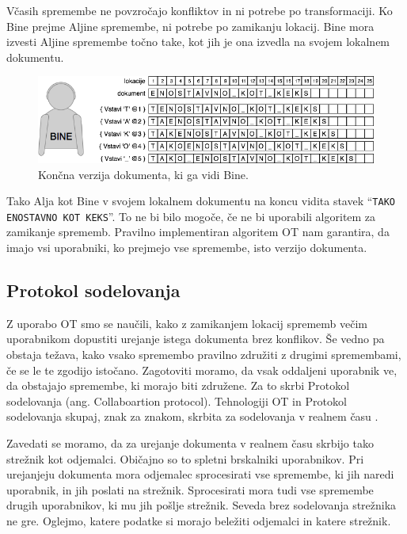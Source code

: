 \documentclass[a4paper, 12pt, twoside]{book}
\begin{document}
Včasih spremembe ne povzročajo konfliktov in ni potrebe po transformaciji. Ko Bine prejme Aljine spremembe, ni potrebe po zamikanju lokacij. Bine mora izvesti Aljine spremembe točno take, kot jih je ona izvedla na svojem lokalnem dokumentu.

\begin{figure}[placement h]
\begin{center}
\includegraphics[width=12cm]{ot6.png}
\end{center}
\caption{Končna verzija dokumenta, ki ga vidi Bine.}
\label{ot6}
\end{figure}

Tako Alja kot Bine v svojem lokalnem dokumentu na koncu vidita stavek “{\tt TAKO ENOSTAVNO KOT KEKS}”. To ne bi bilo mogoče, če ne bi uporabili algoritem za zamikanje sprememb. Pravilno implementiran algoritem OT nam garantira, da imajo vsi uporabniki, ko prejmejo vse spremembe, isto verzijo dokumenta.

\subsection{Protokol sodelovanja}
\label{subsec:ps}

Z uporabo OT smo se naučili, kako z zamikanjem lokacij sprememb večim uporabnikom dopustiti urejanje istega dokumenta brez konflikov. Še vedno pa obstaja težava, kako vsako spremembo pravilno združiti z drugimi spremembami, če se le te zgodijo istočano. Zagotoviti moramo, da vsak oddaljeni uporabnik ve, da obstajajo spremembe, ki morajo biti združene. Za to skrbi Protokol sodelovanja (ang. Collaboartion protocol). Tehnologiji OT in Protokol sodelovanja skupaj, znak za znakom, skrbita za sodelovanja v realnem času \cite{gdocs23}.

Zavedati se moramo, da za urejanje dokumenta v realnem času skrbijo tako strežnik kot odjemalci. Običajno so to spletni brskalniki uporabnikov. Pri urejanjeju dokumenta mora odjemalec sprocesirati vse spremembe, ki jih naredi uporabnik, in jih poslati na strežnik. Sprocesirati mora tudi vse spremembe drugih uporabnikov, ki mu jih pošlje strežnik. Seveda brez sodelovanja strežnika ne gre. Oglejmo, katere podatke si morajo beležiti odjemalci in katere strežnik.
\end{document}
